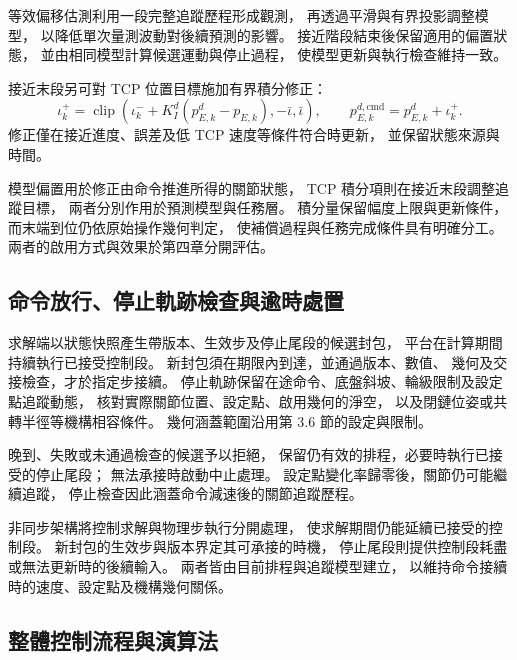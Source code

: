 等效偏移估測利用一段完整追蹤歷程形成觀測，
再透過平滑與有界投影調整模型，
以降低單次量測波動對後續預測的影響。
接近階段結束後保留適用的偏置狀態，
並由相同模型計算候選運動與停止過程，
使模型更新與執行檢查維持一致。

接近末段另可對 TCP 位置目標施加有界積分修正：
\begin{equation}
    \iota_k^+=\operatorname{clip}
    (\iota_k^-+K_I^d(p_{E,k}^d-p_{E,k}),-\bar\iota,\bar\iota),
    \qquad
    p_{E,k}^{d,\mathrm{cmd}}=p_{E,k}^d+\iota_k^+ .
    \label{eq:ch3_bounded_tcp_target_compensation}
\end{equation}
修正僅在接近進度、誤差及低 TCP 速度等條件符合時更新，
並保留狀態來源與時間。

模型偏置用於修正由命令推進所得的關節狀態，
TCP 積分項則在接近末段調整追蹤目標，
兩者分別作用於預測模型與任務層。
積分量保留幅度上限與更新條件，
而末端到位仍依原始操作幾何判定，
使補償過程與任務完成條件具有明確分工。
兩者的啟用方式與效果於第四章分開評估。

\subsection{命令放行、停止軌跡檢查與逾時處置}
\label{subsec:command_acceptance_stopping}

求解端以狀態快照產生帶版本、生效步及停止尾段的候選封包，
平台在計算期間持續執行已接受控制段。
新封包須在期限內到達，並通過版本、數值、
幾何及交接檢查，才於指定步接續。
停止軌跡保留在途命令、底盤斜坡、輪級限制及設定點追蹤動態，
核對實際關節位置、設定點、啟用幾何的淨空，
以及閉鏈位姿或共轉半徑等機構相容條件。
幾何涵蓋範圍沿用第 3.6 節的設定與限制。

晚到、失敗或未通過檢查的候選予以拒絕，
保留仍有效的排程，必要時執行已接受的停止尾段；
無法承接時啟動中止處理。
設定點變化率歸零後，關節仍可能繼續追蹤，
停止檢查因此涵蓋命令減速後的關節追蹤歷程。

非同步架構將控制求解與物理步執行分開處理，
使求解期間仍能延續已接受的控制段。
新封包的生效步與版本界定其可承接的時機，
停止尾段則提供控制段耗盡或無法更新時的後續輸入。
兩者皆由目前排程與追蹤模型建立，
以維持命令接續時的速度、設定點及機構幾何關係。

\subsection{整體控制流程與演算法}
\label{subsec:overall_control_algorithm}


